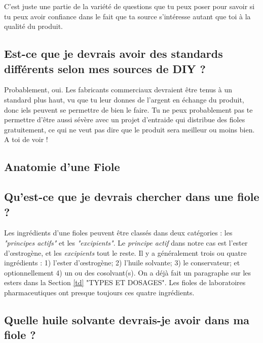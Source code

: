 \documentclass{article}
\begin{document}
C'est juste une partie de la variété de questions que tu peux poser pour savoir si tu peux avoir confiance dans le fait que ta source s'intéresse autant que toi à la qualité du produit.

\subsection{Est-ce que je devrais avoir des standards différents selon mes sources de DIY ?}

Probablement, oui. Les fabricants commerciaux devraient être tenus à un standard plus haut, vu que tu leur donnes de l'argent en échange du produit, donc iels peuvent se permettre de bien le faire. Tu ne peux probablement pas te permettre d'être aussi sévère avec un projet d'entraide qui distribue des fioles gratuitement, ce qui ne veut pas dire que le produit sera meilleur ou moins bien. A toi de voir !

\subsection*{Anatomie d'une Fiole}

\subsection{Qu'est-ce que je devrais chercher dans une fiole ?}

Les ingrédients d'une fioles peuvent être classés dans deux catégories : les \textit{"principes actifs"} et les \textit{"excipients"}. Le \textit{principe actif} dans notre cas est l'ester d'œstrogène, et les \textit{excipients} tout le reste. Il y a généralement trois ou quatre ingrédients : 1) l'ester d'œstrogène; 2) l'huile solvante; 3) le conservateur; et optionnellement 4) un ou des cosolvant(s). On a déjà fait un paragraphe sur les esters dans la Section \ref{td} "TYPES ET DOSAGES". Les fioles de laboratoires pharmaceutiques ont presque toujours ces quatre ingrédients.

\subsection{Quelle huile solvante devrais-je avoir dans ma fiole ?}\label{6-16}
\end{document}
